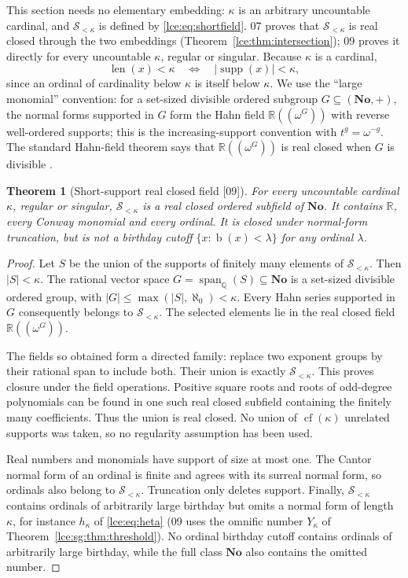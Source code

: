 \documentclass[11pt,letterpaper]{article}
\numberwithin{equation}{section}
\newtheorem{theorem}{Theorem}[section]
\theoremstyle{definition}
\theoremstyle{remark}
\newcommand{\No}{\mathbf{No}}
\newcommand{\R}{\mathbb R}
\newcommand{\Q}{\mathbb Q}
\newcommand{\supp}{\operatorname{supp}}
\newcommand{\bd}{\operatorname{b}}
\newcommand{\len}{\operatorname{len}}
\newcommand{\Sk}{\mathscr S_{<\kappa}}
\newcommand{\abs}[1]{\lvert#1\rvert}
\newcommand{\thref}[1]{Theorem~\ref{#1}}
\newcommand{\src}[1]{\textup{\textsf{\small[#1]}}}%
\newcommand{\cf}{\operatorname{cf}}
\newcommand{\Span}{\operatorname{span}_{\Q}}
\newcommand{\Hahn}[1]{\R((\omega^{#1}))}
\begin{document}
This section needs no elementary embedding: $\kappa$ is an arbitrary
uncountable cardinal, and $\Sk$ is defined by \eqref{lce:eq:shortfield}.
07 proves that $\Sk$ is real closed through the two embeddings
(\thref{lce:thm:intersection}); 09 proves it directly for every
uncountable $\kappa$, regular or singular. Because $\kappa$ is a cardinal,
\begin{equation}\label{lce:sg:eq:length-card}
 \len(x)<\kappa\quad\Longleftrightarrow\quad \abs{\supp(x)}<\kappa,
\end{equation}
since an ordinal of cardinality below $\kappa$ is itself below $\kappa$. We
use the ``large monomial'' convention: for a set-sized divisible ordered
subgroup $G\subseteq(\No,+)$, the normal forms supported in $G$ form the Hahn
field $\Hahn G$ with reverse well-ordered supports; this is the
increasing-support convention with $t^g=\omega^{-g}$. The standard Hahn-field
theorem says that $\Hahn G$ is real closed when $G$ is divisible
\cite{Conway,Gonshor,Berarducci}.

\begin{theorem}[Short-support real closed field \src{09}]\label{lce:sg:thm:shortfield}
For every uncountable cardinal $\kappa$, regular or singular, $\Sk$ is a
real closed ordered subfield of $\No$. It contains $\R$, every Conway
monomial and every ordinal. It is closed under normal-form truncation, but
is not a birthday cutoff $\{x:\bd(x)<\lambda\}$ for any ordinal $\lambda$.
\end{theorem}
\begin{proof}
Let $S$ be the union of the supports of finitely many elements of $\Sk$.
Then $\abs S<\kappa$. The rational vector space $G=\Span(S)\subseteq\No$ is a
set-sized divisible ordered group, with $\abs G\le\max(\abs S,\aleph_0)<\kappa$.
Every Hahn series supported in $G$ consequently belongs to $\Sk$. The
selected elements lie in the real closed field $\Hahn G$.

The fields so obtained form a directed family: replace two exponent groups
by their rational span to include both. Their union is exactly $\Sk$. This
proves closure under the field operations. Positive square roots and roots
of odd-degree polynomials can be found in one such real closed subfield
containing the finitely many coefficients. Thus the union is real closed.
No union of $\cf(\kappa)$ unrelated supports was taken, so no regularity
assumption has been used.

Real numbers and monomials have support of size at most one. The Cantor
normal form of an ordinal is finite and agrees with its surreal normal form,
so ordinals also belong to $\Sk$. Truncation only deletes support. Finally,
$\Sk$ contains ordinals of arbitrarily large birthday but omits a normal form
of length $\kappa$, for instance $h_\kappa$ of \eqref{lce:eq:heta} (09 uses
the omnific number $Y_\kappa$ of \thref{lce:sg:thm:threshold}). No ordinal
birthday cutoff contains ordinals of arbitrarily large birthday, while the
full class $\No$ also contains the omitted number.
\end{proof}
\end{document}
